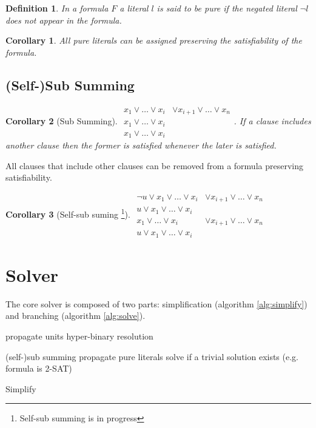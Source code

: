 \documentclass[12pt]{article}
\newtheorem{definition}{Definition}
\newtheorem{corollary}{Corollary}
\begin{document}
\begin{definition}
In a formula $F$ a literal $l$ is said to be \emph{pure} if the negated literal $\neg l$ does
not appear in the formula.
\end{definition}

\begin{corollary}
All pure literals can be assigned preserving the satisfiability of the formula.
\end{corollary}

\subsection{(Self-)Sub Summing}

\begin{corollary}[Sub Summing]
$\begin{array}{rl}
x_1 \lor \ldots \lor x_i &\lor x_{i+1} \lor \ldots \lor x_n \\
x_1 \lor \ldots \lor x_i & \\
\hline
x_1 \lor \ldots \lor x_i &
\end{array}$. If a clause includes another clause then the former is satisfied whenever the
later is satisfied.
\end{corollary}

All clauses that include other clauses can be removed from a formula preserving satisfiability.

\begin{corollary}[Self-sub suming \footnote{Self-sub summing is in progress}]
$\begin{array}{rl}
\neg u \lor x_1 \lor \ldots \lor x_i &\lor x_{i+1} \lor \ldots \lor x_n \\
u \lor x_1 \lor \ldots \lor x_i & \\
\hline
x_1 \lor \ldots \lor x_i &\lor x_{i+1} \lor \ldots \lor x_n \\
u \lor x_1 \lor \ldots \lor x_i &
\end{array}$
\end{corollary}


\section{Solver}

The core solver is composed of two parts: simplification (algorithm \ref{alg:simplify}) and
branching (algorithm \ref{alg:solve}).

\begin{algorithm}[h!]
\begin{algorithmic}

  \STATE propagate units
  \STATE hyper-binary resolution
\ENDWHILE

\STATE (self-)sub summing
\STATE propagate pure literals
\STATE solve if a trivial solution exists (e.g. formula is 2-SAT)

\end{algorithmic}
\caption{Simplify}
\label{alg:simplify}
\end{algorithm}
\end{document}
